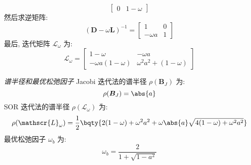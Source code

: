 \documentclass[lang = zh]{iwork}
\begin{document}
\begin{sol}
\begin{equation*}
\begin{bmatrix}
      0          & 1 - \omega
    \end{bmatrix}
  \end{equation*}
  然后求逆矩阵:
  \begin{equation*}
    (\bm{D} - \omega \bm{L})^{-1} =
    \begin{bmatrix}
      1          & 0 \\
      - \omega a & 1
    \end{bmatrix}
  \end{equation*}
  最后, 迭代矩阵 $\mathscr{L}_{\omega}$ 为:
  \begin{equation*}
    \mathscr{L}_{\omega} =
    \begin{bmatrix}
      1 - \omega              & - \omega a                  \\
      - \omega a (1 - \omega) & \omega^2 a^2 + (1 - \omega)
    \end{bmatrix}
  \end{equation*}
  \item[\emph{谱半径和最优松弛因子}]
  Jacobi 迭代法的谱半径 $\rho(\bm{B}_J)$ 为:
  \begin{equation*}
    \rho(\bm{B}_J) = \abs{a}
  \end{equation*}
  SOR 迭代法的谱半径 $\rho(\mathscr{L}_{\omega})$ 为:
  \begin{equation*}
    \rho(\mathscr{L}_{\omega}) = \frac{1}{2} \bqty{2 (1 - \omega) + \omega^2 a^2 + \omega \abs{a} \sqrt{4 (1 - \omega) + \omega^2 a^2}}
  \end{equation*}
  最优松弛因子 $\omega_b$ 为:
  \begin{equation*}
    \omega_b = \frac{2}{1 + \sqrt{1 - a^2}}
  \end{equation*}
\end{sol}
\end{document}
